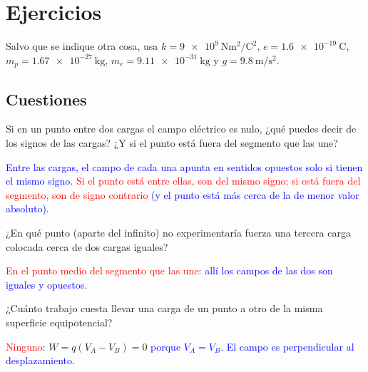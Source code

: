
\section{Ejercicios}\label{sec:ele-ejercicios}

Salvo que se indique otra cosa, usa \(k = \qty{9e9}{\newton\m\squared\per\coulomb\squared}\), \(e = \qty{1.6e-19}{\coulomb}\),
\(m_p = \qty{1.67e-27}{\kg}\), \(m_e = \qty{9.11e-31}{\kg}\) y \(g = \qty{9.8}{\m\per\second\squared}\).

\subsection{Cuestiones}

\begin{exercise}
    Si en un punto entre dos cargas el campo eléctrico es nulo, ¿qué puedes decir de los signos de las cargas? ¿Y si el punto
    está fuera del segmento que las une?
    \begin{solu}
        \textcolor{blue}{Entre las cargas, el campo de cada una apunta en sentidos opuestos solo si tienen el mismo signo.}
        \textcolor{red}{Si el punto está entre ellas, son del mismo signo; si está fuera del segmento, son de signo contrario}
        \textcolor{blue}{(y el punto está más cerca de la de menor valor absoluto).}
    \end{solu}
\end{exercise}

\begin{exercise}
    ¿En qué punto (aparte del infinito) no experimentaría fuerza una tercera carga colocada cerca de dos cargas iguales?
    \begin{solu}
        \textcolor{red}{En el punto medio del segmento que las une}: \textcolor{blue}{allí los campos de las dos son iguales y opuestos.}
    \end{solu}
\end{exercise}

\begin{exercise}
    ¿Cuánto trabajo cuesta llevar una carga de un punto a otro de la misma superficie equipotencial?
    \begin{solu}
        \textcolor{red}{Ninguno}: \(W = q(V_A - V_B) = 0\) \textcolor{blue}{porque \(V_A = V_B\). El campo es perpendicular al desplazamiento.}
    \end{solu}
\end{exercise}

